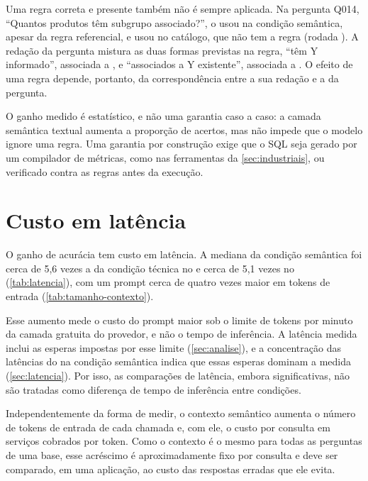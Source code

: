 Uma regra correta e presente também não é sempre aplicada. Na pergunta
Q014, ``Quantos produtos têm subgrupo associado?'', o
 usou  na condição semântica, apesar da
regra referencial, e usou  no catálogo, que não tem a regra
(rodada ). A redação da pergunta mistura as duas formas
previstas na regra, ``têm Y informado'', associada a , e
``associados a Y existente'', associada a . O efeito de uma regra
depende, portanto, da correspondência entre a sua redação e a da pergunta.

O ganho medido é estatístico, e não uma garantia caso a caso: a camada
semântica textual aumenta a proporção de acertos, mas não impede que o
modelo ignore uma regra. Uma garantia por construção exige que o SQL seja
gerado por um compilador de métricas, como nas ferramentas da
\autoref{sec:industriais}, ou verificado contra as regras antes da
execução.

\section{Custo em latência}
\label{sec:custo-latencia}

O ganho de acurácia tem custo em latência. A mediana da condição semântica
foi cerca de 5,6 vezes a da condição técnica no  e cerca
de 5,1 vezes no  (\autoref{tab:latencia}), com um prompt
cerca de quatro vezes maior em tokens de entrada
(\autoref{tab:tamanho-contexto}).

Esse aumento mede o custo do prompt maior sob o limite de tokens por
minuto da camada gratuita do provedor, e não o tempo de inferência. A
latência medida inclui as esperas impostas por esse limite
(\autoref{sec:analise}), e a concentração das latências do
 na condição semântica indica que essas esperas dominam a
medida (\autoref{sec:latencia}). Por isso, as comparações de latência,
embora significativas, não são tratadas como diferença de tempo de
inferência entre condições.

Independentemente da forma de medir, o contexto semântico aumenta o
número de tokens de entrada de cada chamada e, com ele, o custo por
consulta em serviços cobrados por token. Como o contexto é o mesmo para
todas as perguntas de uma base, esse acréscimo é aproximadamente fixo por
consulta e deve ser comparado, em uma aplicação, ao custo das respostas
erradas que ele evita.

